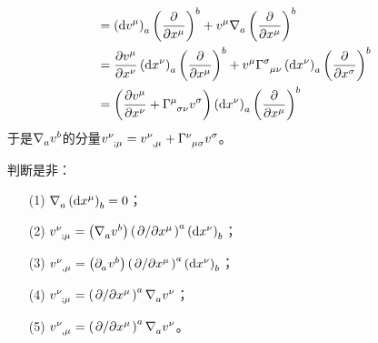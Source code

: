 \begin{xiti}
\begin{zm}
\begin{enumerate}
\begin{align*}
			=&\tmu \tensor{\left(\dd{v^\mu}\right)}{_a} \tensor{\left(\pdv{x^\mu}\right)}{^b} + \tensor{v}{^\mu} \Nabla{a} \tensor{\left(\pdv{x^\mu}\right)}{^b}\\
			=&\; \pdv{\tensor{v}{^\mu}}{x^\nu} \tensor{\left(\dd{x^\nu}\right)}{_a} \tensor{\left(\pdv{x^\mu}\right)}{^b} + \tensor{v}{^\mu} \ChristoffelSymbol{\sigma}{\mu}{\nu} \tensor{\left(\dd{x^\nu}\right)}{_a} \tensor{\left(\pdv{x^\sigma}\right)}{^b}\\
			=&\tmu \left(\pdv{\tensor{v}{^\mu}}{x^\nu} +  \ChristoffelSymbol{\mu}{\sigma}{\nu} \tensor{v}{^\sigma} \right) \tensor{\left(\dd{x^\nu}\right)}{_a} \tensor{\left(\pdv{x^\mu}\right)}{^b}
			\end{align*}
			于是$\Nabla{a}\tensor{v}{^b}$的分量$\tensor{v}{^\nu_{;\mu}}=\tensor{v}{^\nu_{,\mu}}+\ChristoffelSymbol{\nu}{\mu}{\sigma} \tensor{v}{^\sigma} $。
		\end{enumerate}
	\end{zm}
	
	\item 判断是非：
	\begin{enumerate}
		\item[(1)] \hypertarget{3.5.1}{}$\Nabla{a} \tensor{\left(\dd{x^\mu}\right)}{_b} =0 $；
		\item[(2)] $\tensor{v}{^\nu_{;\mu}} = \left(\Nabla{a} \tensor{v}{^b} \right) \tensor{\left(\pd{x^\mu} \right)}{^a} \tensor{\left(\dd{x^\nu}\right)}{_b} $；
		\item[(3)] $\tensor{v}{^\nu_{,\mu}} = \left(\Partial{a} \tensor{v}{^b} \right) \tensor{\left(\pd{x^\mu} \right)}{^a} \tensor{\left(\dd{x^\nu}\right)}{_b} $；
		\item[(4)] \hypertarget{3.5.4}{} $\tensor{v}{^\nu_{;\mu}}=\tensor{\left(\pd{x^\mu}\right)}{^a} \Nabla{a} \tensor{v}{^\nu} $；
		\item[(5)] $\tensor{v}{^\nu_{,\mu}}=\tensor{\left(\pd{x^\mu}\right)}{^a} \Nabla{a} \tensor{v}{^\nu} $。
	\end{enumerate}
	

\end{xiti}
